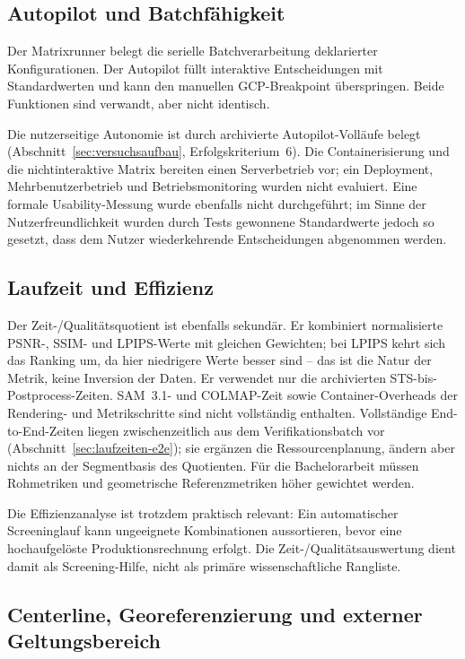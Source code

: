 \subsection{Autopilot und Batchfähigkeit}

Der Matrixrunner belegt die serielle Batchverarbeitung deklarierter
Konfigurationen. Der Autopilot füllt interaktive Entscheidungen mit
Standardwerten und kann den manuellen GCP-Breakpoint überspringen. Beide
Funktionen sind verwandt, aber nicht identisch.

Die nutzerseitige Autonomie ist durch archivierte Autopilot-Volläufe belegt
(Abschnitt~\ref{sec:versuchsaufbau}, Erfolgskriterium~6). Die
Containerisierung und die nichtinteraktive Matrix bereiten einen Serverbetrieb
vor; ein Deployment, Mehrbenutzerbetrieb und Betriebsmonitoring wurden nicht
evaluiert. Eine formale Usability-Messung wurde ebenfalls nicht durchgeführt;
im Sinne der Nutzerfreundlichkeit wurden durch Tests gewonnene Standardwerte
jedoch so gesetzt, dass dem Nutzer wiederkehrende Entscheidungen abgenommen
werden.

\subsection{Laufzeit und Effizienz}

Der Zeit-/Qualitätsquotient ist ebenfalls sekundär. Er kombiniert normalisierte
PSNR-, SSIM- und LPIPS-Werte mit gleichen Gewichten; bei LPIPS kehrt sich das
Ranking um, da hier niedrigere Werte besser sind – das ist die Natur der
Metrik, keine Inversion der Daten. Er verwendet
nur die archivierten STS-bis-Postprocess-Zeiten. SAM~3.1- und COLMAP-Zeit sowie
Container-Overheads der Rendering- und Metrikschritte sind nicht vollständig
enthalten. Vollständige End-to-End-Zeiten liegen zwischenzeitlich aus dem
Verifikationsbatch  vor
(Abschnitt~\ref{sec:laufzeiten-e2e}); sie ergänzen die Ressourcenplanung,
ändern aber nichts an der Segmentbasis des Quotienten. Für die
Bachelorarbeit müssen Rohmetriken und geometrische
Referenzmetriken höher gewichtet werden.

Die Effizienzanalyse ist trotzdem praktisch relevant: Ein automatischer
Screeninglauf kann ungeeignete Kombinationen aussortieren, bevor eine
hochaufgelöste Produktionsrechnung erfolgt. Die Zeit-/Qualitätsauswertung
dient damit als Screening-Hilfe, nicht als primäre wissenschaftliche
Rangliste.

\subsection{Centerline, Georeferenzierung und externer Geltungsbereich}

